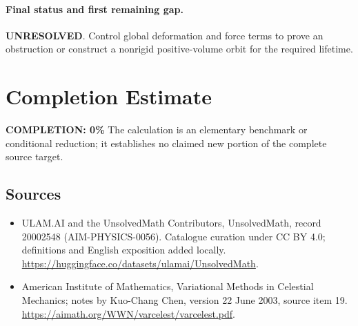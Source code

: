 \documentclass[11pt]{article}
\begin{document}
\paragraph{Final status and first remaining gap.}
\textbf{UNRESOLVED}. Control global deformation and force terms to prove an obstruction or construct a nonrigid positive-volume orbit for the required lifetime.

\section{Completion Estimate}
\noindent\textbf{COMPLETION: 0\%}
The calculation is an elementary benchmark or conditional reduction; it establishes no claimed new portion of the complete source target.

\subsection{Sources}
\begin{itemize}
\item[\hypertarget{source:20002548:1}{S1}] ULAM.AI and the UnsolvedMath Contributors, UnsolvedMath, record 20002548 (AIM-PHYSICS-0056). Catalogue curation under CC BY 4.0; definitions and English exposition added locally.
\url{https://huggingface.co/datasets/ulamai/UnsolvedMath}.
\item[\hypertarget{source:20002548:2}{S2}] American Institute of Mathematics, Variational Methods in Celestial Mechanics; notes by Kuo-Chang Chen, version 22 June 2003, source item 19.
\url{https://aimath.org/WWN/varcelest/varcelest.pdf}.
\end{itemize}
\label{end:20002548}
\end{document}
